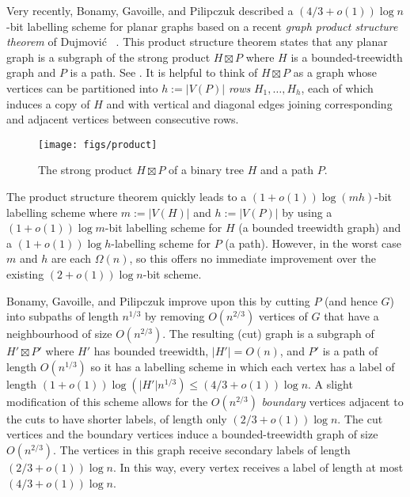\documentclass[kpfonts]{patmorin}
\begin{document}
Very recently, Bonamy, Gavoille, and Pilipczuk \cite{bonamy.gavoille.ea:shorter} described a $(4/3+o(1))\log n$-bit labelling scheme for planar graphs based on a recent \emph{graph product structure theorem} of Dujmović \etal\ \cite{dujmovic.joret.ea:planar}.  This product structure theorem states that any planar graph is a subgraph of the strong product $H\boxtimes P$ where $H$ is a bounded-treewidth graph and $P$ is a path. See . It is helpful to think of $H\boxtimes P$ as a graph whose vertices can be partitioned into $h:=|V(P)|$ \emph{rows} $H_1,\ldots,H_{h}$, each of which induces a copy of $H$ and with vertical and diagonal edges joining corresponding and adjacent vertices between consecutive rows.  

\begin{figure}[htbp]
  \begin{center}
    \texttt{[image: figs/product]}
  \end{center}
  \caption{The strong product $H\boxtimes P$ of a binary tree $H$ and a path $P$.}
\end{figure}  

The product structure theorem quickly leads to a $(1+o(1))\log(mh)$-bit labelling scheme where $m:=|V(H)|$ and $h:=|V(P)|$ by using a $(1+o(1))\log m$-bit labelling scheme for $H$ (a bounded treewidth graph) and a $(1+o(1))\log h$-labelling scheme for $P$ (a path).  However, in the worst case $m$ and $h$ are each $\Omega(n)$, so this offers no immediate improvement over the existing $(2+o(1))\log n$-bit scheme.

Bonamy, Gavoille, and Pilipczuk improve upon this by cutting $P$ (and hence $G$) into subpaths of length $n^{1/3}$ by removing $O(n^{2/3})$ vertices of $G$ that have a neighbourhood of size $O(n^{2/3})$. The resulting (cut) graph is a subgraph of $H'\boxtimes P'$ where $H'$ has bounded treewidth, $|H'|=O(n)$, and $P'$ is a path of length $O(n^{1/3})$ so it has a labelling scheme in which each vertex has a label of length $(1+o(1))\log (|H'|n^{1/3})\le (4/3+o(1))\log n$.  A slight modification of this scheme allows for the $O(n^{2/3})$ \emph{boundary} vertices adjacent to the cuts to have shorter labels, of length only $(2/3+o(1))\log n$.  The cut vertices and the boundary vertices induce a bounded-treewidth graph of size $O(n^{2/3})$.  The vertices in this graph receive secondary labels of length $(2/3+o(1))\log n$.  In this way, every vertex receives a label of length at most $(4/3 + o(1))\log n$.
\end{document}
